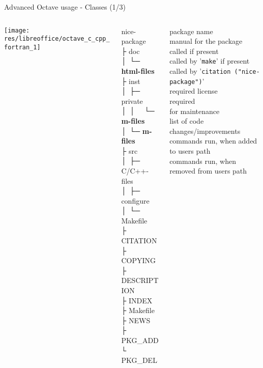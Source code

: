 \begin{frame}{Advanced Octave usage - Classes (1/3)}
\begin{columns}
\begin{column}[t]{0.2\textwidth}
\texttt{[image: res/libreoffice/octave\_c\_cpp\_fortran\_1]}
\end{column}
\begin{column}{0.2\textwidth}
\ttfamily\scriptsize
\colorbox{green!30}{nice-package} \\
├ \colorbox{orange!30}{doc} \\
│ └─ \textbf{html-files} \\
├ \colorbox{orange!30}{inst} \\
│ ├─ \colorbox{orange!30}{private} \\
│ │ \ \ └─ \textbf{m-files} \\
│ └─ \textbf{m-files} \\
├ \colorbox{orange!30}{src} \\
│ ├─ C/C++-files \\
│ ├─ configure \\
│ └─ Makefile \\
├ CITATION \\
├ {\color{red!50!black}COPYING}  \\
├ {\color{red!50!black}DESCRIPTION} \\
├ INDEX    \\
├ Makefile \\
├ NEWS     \\
├ PKG\_ADD \\
└ PKG\_DEL \\
\end{column}
\begin{column}{0.5\textwidth}
\color{green!50!black}\scriptsize
package name \\[2em]
manual for the package \\[8em]
called if present \\
called by '\texttt{make}' if present \\
called by '\texttt{citation ("nice-package")}' \\
{\color{red!50!black}required} license \\
{\color{red!50!black}required} \\[1em]
for maintenance \\
list of code changes/improvements \\
commands run, when added   to   users path \\
commands run, when removed from users path
\end{column}
\end{columns}
\end{frame}